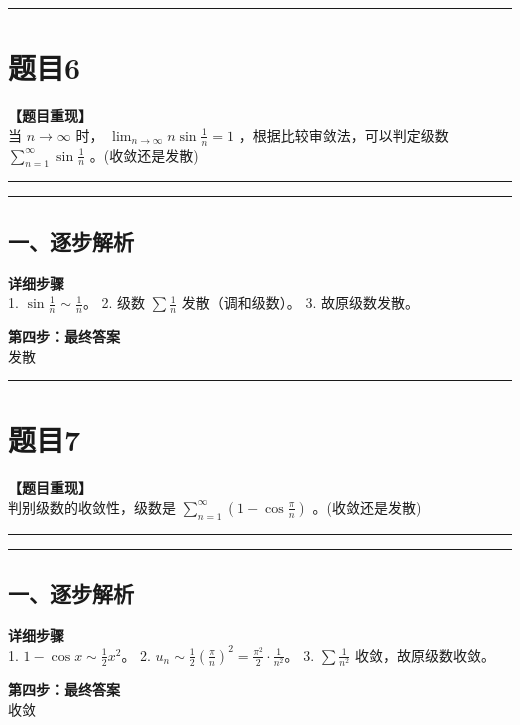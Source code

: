 \documentclass[12pt, a4paper]{ctexart}
\newcommand{\TopSeparator}{
    \par\noindent\rule{\textwidth}{1.5pt}\vspace{0.5em} %
}
\newcommand{\AnalysisSeparator}{
    \par\noindent\rule{\textwidth}{0.5pt}\vspace{0.2em}\hrule\vspace{0.5em} %
}
\newenvironment{RedAnalysis}{
    \par
    \color{red} %
}{
    \par
    \color{black} %
}
\begin{document}
\vspace{2em}

\TopSeparator
\section*{题目6}

\textbf{【题目重现】} \\
当 $ n \to \infty $ 时， $ \lim_{n \to \infty} n \sin \frac{1}{n} = 1 $ ，根据比较审敛法，可以判定级数 $ \sum_{n=1}^{\infty} \sin \frac{1}{n} $ \underline{\hspace{2cm}}。(收敛还是发散)

\AnalysisSeparator

\begin{RedAnalysis}

\subsection*{一、逐步解析}

\textbf{详细步骤} \\
1. $\sin \frac{1}{n} \sim \frac{1}{n}$。
2. 级数 $\sum \frac{1}{n}$ 发散（调和级数）。
3. 故原级数发散。

\textbf{第四步：最终答案} \\
发散

\end{RedAnalysis}

\vspace{2em}

\TopSeparator
\section*{题目7}

\textbf{【题目重现】} \\
判别级数的收敛性，级数是 $ \sum_{n=1}^{\infty}(1-\cos\frac{\pi}{n}) $ \underline{\hspace{2cm}}。(收敛还是发散)

\AnalysisSeparator

\begin{RedAnalysis}

\subsection*{一、逐步解析}

\textbf{详细步骤} \\
1. $1 - \cos x \sim \frac{1}{2}x^2$。
2. $u_n \sim \frac{1}{2} (\frac{\pi}{n})^2 = \frac{\pi^2}{2} \cdot \frac{1}{n^2}$。
3. $\sum \frac{1}{n^2}$ 收敛，故原级数收敛。

\textbf{第四步：最终答案} \\
收敛

\end{RedAnalysis}
\end{document}
